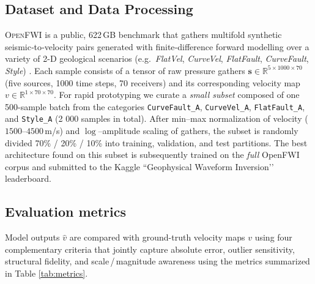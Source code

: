 \documentclass{article}
\begin{document}
\subsection{Dataset and Data Processing}\label{subsec:data}
\textsc{OpenFWI} is a public, 622\,GB benchmark that gathers multi\-fold synthetic seismic‐to‐velocity pairs generated with finite‐difference forward modelling over a variety of 2-D geological scenarios (e.g.\ \emph{FlatVel}, \emph{CurveVel}, \emph{FlatFault}, \emph{CurveFault}, \emph{Style}) \cite{openfwi2021,openfwi2023}.  Each sample consists of a tensor of raw pressure gathers $\mathbf{s}\!\in\!\mathbb{R}^{5\times1000\times70}$ (five sources, 1000 time steps, 70 receivers) and its corresponding velocity map $v\!\in\!\mathbb{R}^{1\times70\times70}$.  
For rapid prototyping we curate a \emph{small subset} composed of one 500-sample batch from the categories \texttt{CurveFault\_A}, \texttt{CurveVel\_A}, \texttt{FlatFault\_A}, and \texttt{Style\_A} (2 000 samples in total).  
After min–max normalization of velocity ($1500$–$4500$\,m/s) and $\log$–amplitude scaling of gathers, the subset is randomly divided 70\% / 20\% / 10\% into training, validation, and test partitions.  
The best architecture found on this subset is subsequently trained on the \emph{full} OpenFWI corpus and submitted to the Kaggle “Geophysical Waveform Inversion’’ leaderboard.

\subsection{Evaluation metrics}\label{subsec:metrics}
Model outputs $\hat{v}$ are compared with ground-truth velocity maps $v$ using four complementary criteria that jointly capture absolute error, outlier sensitivity, structural fidelity, and scale\,/\,magnitude awareness using the metrics summarized in Table \ref{tab:metrics}.
\end{document}
